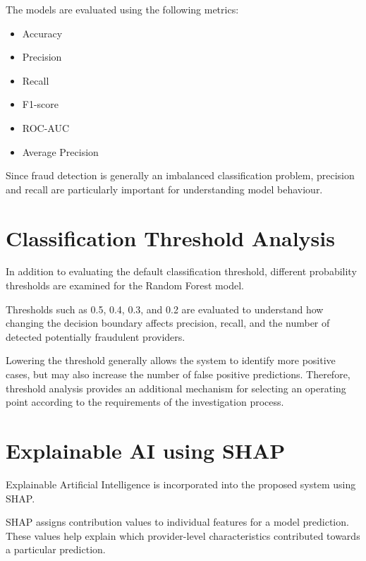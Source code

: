 The models are evaluated using the following metrics:

\begin{itemize}

\item Accuracy

\item Precision

\item Recall

\item F1-score

\item ROC-AUC

\item Average Precision

\end{itemize}

Since fraud detection is generally an imbalanced classification problem, precision and recall are particularly important for understanding model behaviour.

\section{Classification Threshold Analysis}

In addition to evaluating the default classification threshold, different probability thresholds are examined for the Random Forest model.

Thresholds such as 0.5, 0.4, 0.3, and 0.2 are evaluated to understand how changing the decision boundary affects precision, recall, and the number of detected potentially fraudulent providers.

Lowering the threshold generally allows the system to identify more positive cases, but may also increase the number of false positive predictions. Therefore, threshold analysis provides an additional mechanism for selecting an operating point according to the requirements of the investigation process.

\section{Explainable AI using SHAP}

Explainable Artificial Intelligence is incorporated into the proposed system using SHAP.

SHAP assigns contribution values to individual features for a model prediction. These values help explain which provider-level characteristics contributed towards a particular prediction.


